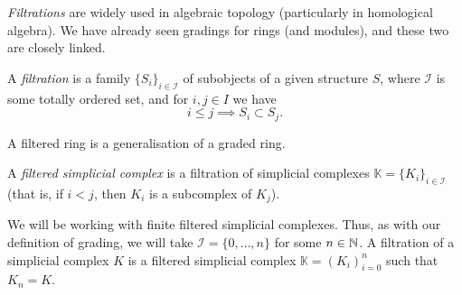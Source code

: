 \emph{Filtrations} are widely used in algebraic topology (particularly in homological algebra). We have already seen gradings for rings (and modules), and these two are closely linked. 

\begin{definition}[Filtration]
    A \emph{filtration} is a family $\{S_i\}_{i \in \mathcal I}$ of subobjects of a given structure $S$, where $\mathcal I$ is some totally ordered set, and for $i, j \in I$ we have
    \[ i \leq j \implies S_i \subset S_j. \]
\end{definition}

A filtered ring is a generalisation of a graded ring. 

\begin{definition}
    A \emph{filtered simplicial complex} is a filtration of simplicial complexes $\mathbb K = \{K_i\}_{i \in \mathcal I}$ (that is, if $i < j$, then $K_i$ is a subcomplex of $K_j$). 
\end{definition}

We will be working with finite filtered simplicial complexes. Thus, as with our definition of grading, we will take $\mathcal I = \{0, \ldots, n\}$ for some $n \in \mathbb N$. A filtration of a simplicial complex $K$ is a filtered simplicial complex $\mathbb K = (K_i)_{i=0}^n$ such that $K_n = K$. 

